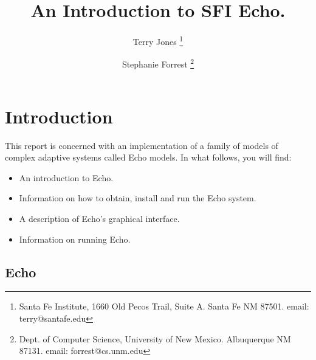 


\newenvironment{shell}{\begin{verse}\begin{sf}}{\end{sf}\end{verse}}
\newcommand{\prompt}{{\bf \%}}

\title {{\bf An Introduction to SFI Echo.}}

\author
{
Terry Jones
\thanks
{
Santa Fe Institute, 1660 Old Pecos Trail, Suite A.
Santa Fe NM 87501.
email: terry@santafe.edu
}
\and
Stephanie Forrest
\thanks
{
Dept. of Computer Science,
University of New Mexico.
Albuquerque NM  87131.
email: forrest@cs.unm.edu
}
}


\maketitle
\newpage


\pagestyle{plain}
\tableofcontents
\newpage
\pagestyle{headings}

\section{Introduction}

This report is concerned with an implementation of a family of models
of complex adaptive systems called Echo models. In what follows, you
will find:

\begin{itemize}

\item
An introduction to Echo.

\item
Information on how to obtain, install and run the Echo system.

\item
A description of Echo's graphical interface.

\item
Information on running Echo.

\end{itemize}

\subsection{Echo}

